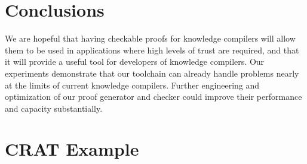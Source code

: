 \documentclass[letterpaper,USenglish,cleveref, autoref, thm-restate]{lipics-v2021}
\newcommand{\pand}{\mathbin{\land^{\sf p}}}
\newcommand{\dependencyset}{{\cal D}}
\newcommand{\modelset}{{\cal M}}
\newcommand{\makenode}[1]{\mathbf{#1}}
\newcommand{\nodeu}{\makenode{u}}
\begin{document}
\section{Conclusions}
\label{sect:future}

We are hopeful that having checkable proofs for knowledge compilers
will allow them to be used in applications where high levels of trust
are required, and that it will provide a useful tool for developers of
knowledge compilers.
Our experiments demonstrate that our toolchain can already
 handle problems nearly at the limits of current knowledge compilers.
Further engineering and optimization of our proof
generator and checker could improve their performance and capacity substantially.








\newpage

\appendix

\section{CRAT Example}
\label{app:crat:example}
\end{document}
